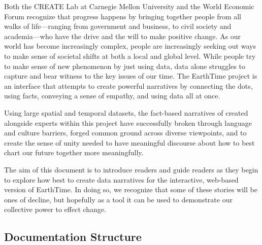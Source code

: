 \documentclass[
  12pt,
]{krantz}
\begin{document}
Both the CREATE Lab at Carnegie Mellon University and the World Economic Forum recognize that progress happens by bringing together people from all walks of life---ranging from government and business, to civil society and academia---who have the drive and the will to make positive change. As our world has become increasingly complex, people are increasingly seeking out ways to make sense of societal shifts at both a local and global level. While people try to make sense of new phenomenon by just using data, data alone struggles to capture and bear witness to the key issues of our time. The EarthTime project is an interface that attempts to create powerful narratives by connecting the dots, using facts, conveying a sense of empathy, and using data all at once.

Using large spatial and temporal datasets, the fact-based narratives of created alongside experts within this project have successfully broken through language and culture barriers, forged common ground across diverse viewpoints, and to create the sense of unity needed to have meaningful discourse about how to best chart our future together more meaningfully.

The aim of this document is to introduce readers and guide readers as they begin to explore how best to create data narratives for the interactive, web-based version of EarthTime. In doing so, we recognize that some of these stories will be ones of decline, but hopefully as a tool it can be used to demonstrate our collective power to effect change.

\hypertarget{documentation-structure}{%
\subsection*{Documentation Structure}\label{documentation-structure}}
\end{document}
